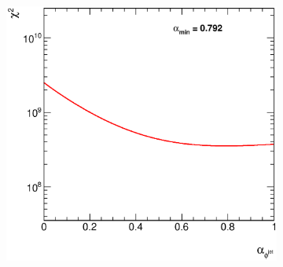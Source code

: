 \documentclass[12pt, twoside]{article}
\numberwithin{equation}{section}
\numberwithin{figure}{section}
\newenvironment{changemargin}[2]{%
\begin{list}{}{%
\setlength{\topsep}{0pt}%
\setlength{\leftmargin}{#1}%
\setlength{\rightmargin}{#2}%
\setlength{\listparindent}{\parindent}%
\setlength{\itemindent}{\parindent}%
\setlength{\parsep}{\parskip}%
}%
\item[]}{\end{list}}
\begin{document}
\begin{figure}[H]
\begin{changemargin}{-0.5cm}{-0.0cm}
\begin{changemargin}{-0.0cm}{-0.5cm}
\begin{subfigure}[b]{0.33\textwidth}
            \subcaption{}
            \label{fig:ChiSquareRapidityJet}
        \end{subfigure}
        \begin{subfigure}[b]{0.33\textwidth}
            \includegraphics[width=\textwidth]{./images/ChiSquareTest/CHI2-106.eps}
            \subcaption{}
            \label{fig:ChiSquarePhiJet}
        \end{subfigure}


\end{changemargin}
\end{changemargin}
\end{figure}
\end{document}
